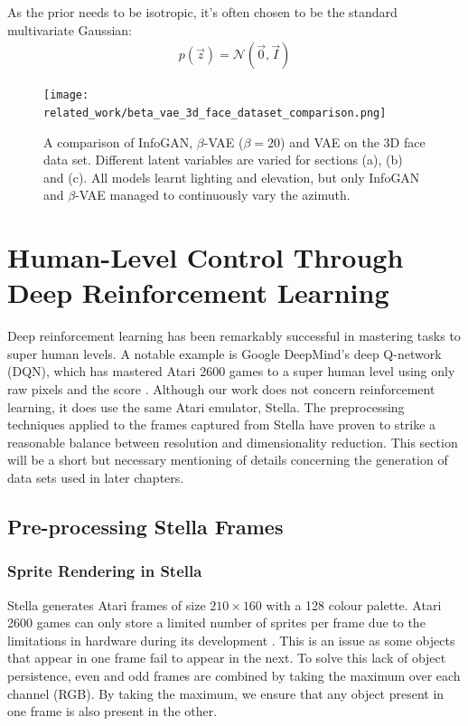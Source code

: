As the prior needs to be isotropic, it's often chosen to be the standard multivariate Gaussian:
\begin{align}
p(\vec{z}) = \mathcal{N}(\vec{0}, \vec{I})
\end{align}

\begin{figure}[h!]
\centering
\captionsetup{justification=centering}
\texttt{[image: related\_work/beta\_vae\_3d\_face\_dataset\_comparison.png]}
\caption{A comparison of InfoGAN, $\beta$-VAE ($\beta = 20$) and VAE on the 3D face data set. Different latent variables are varied for sections (a), (b) and (c). All models learnt lighting and elevation, but only InfoGAN and $\beta$-VAE managed to continuously vary the azimuth. \cite{Thiagarajan2016}}
\label{fig:beta_vae_3d_face_dataset_comparison}
\end{figure}


%
%
%
%
%
\section{Human-Level Control Through Deep Reinforcement Learning}
Deep reinforcement learning has been remarkably successful in mastering tasks to super human levels. A notable example is Google DeepMind's deep Q-network (DQN), which has mastered Atari 2600 games to a super human level using only raw pixels and the score \cite{Mnih2015}. Although our work does not concern reinforcement learning, it does use the same Atari emulator, Stella. The preprocessing techniques applied to the frames captured from Stella have proven to strike a reasonable balance between resolution and dimensionality reduction. This section will be a short but necessary mentioning of details concerning the generation of data sets used in later chapters.

\subsection{Pre-processing Stella Frames}

\subsubsection{Sprite Rendering in Stella}
Stella generates Atari frames of size $210 \times 160$ with a 128 colour palette. Atari 2600 games can only store a limited number of sprites per frame due to the limitations in hardware during its development \cite{Mnih2015}. This is an issue as some objects that appear in one frame fail to appear in the next. To solve this lack of object persistence, even and odd frames are combined by taking the maximum over each channel (RGB). By taking the maximum, we ensure that any object present in one frame is also present in the other. 

